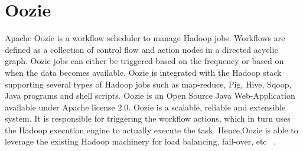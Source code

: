 \section{Oozie}
Apache Oozie is a workflow scheduler to manage Hadoop jobs. Workflows are 
defined as a collection of control flow and action nodes in a directed 
acyclic graph. Oozie jobs can either be triggered based on the frequency 
or based on when the data becomes available. Oozie is integrated with the 
Hadoop stack supporting several types of Hadoop jobs such as map-reduce, Pig,
Hive, Sqoop, Java programs and shell scripts. Oozie is an Open Source Java 
Web-Application available under Apache license 2.0. Oozie is a scalable, 
reliable and extensible system. It is responsible for triggering the workflow 
actions, which in turn uses the Hadoop execution engine to actually execute 
the task. Hence,Oozie is able to leverage the existing Hadoop machinery for
load balancing, fail-over, etc ~\cite{hid-sp18-513-oozie}.
